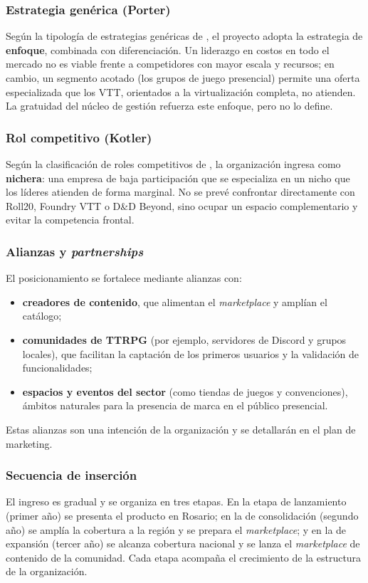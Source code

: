 \subsubsection{Estrategia genérica (Porter)}
Según la tipología de estrategias genéricas de \textcite{porter1985}, el proyecto adopta la estrategia de \textbf{enfoque}, combinada con diferenciación. Un liderazgo en costos en todo el mercado no es viable frente a competidores con mayor escala y recursos; en cambio, un segmento acotado (los grupos de juego presencial) permite una oferta especializada que los VTT, orientados a la virtualización completa, no atienden. La gratuidad del núcleo de gestión refuerza este enfoque, pero no lo define.

\subsubsection{Rol competitivo (Kotler)}
Según la clasificación de roles competitivos de \textcite{kotler2016}, la organización ingresa como \textbf{nichera}: una empresa de baja participación que se especializa en un nicho que los líderes atienden de forma marginal. No se prevé confrontar directamente con Roll20, Foundry VTT o D\&D Beyond, sino ocupar un espacio complementario y evitar la competencia frontal.

\subsubsection{Alianzas y \textit{partnerships}}
El posicionamiento se fortalece mediante alianzas con:
\begin{itemize}
  \item \textbf{creadores de contenido}, que alimentan el \textit{marketplace} y amplían el catálogo;
  \item \textbf{comunidades de TTRPG} (por ejemplo, servidores de Discord y grupos locales), que facilitan la captación de los primeros usuarios y la validación de funcionalidades;
  \item \textbf{espacios y eventos del sector} (como tiendas de juegos y convenciones), ámbitos naturales para la presencia de marca en el público presencial.
\end{itemize}
Estas alianzas son una intención de la organización y se detallarán en el plan de marketing.

\subsubsection{Secuencia de inserción}
El ingreso es gradual y se organiza en tres etapas. En la etapa de lanzamiento (primer año) se presenta el producto en Rosario; en la de consolidación (segundo año) se amplía la cobertura a la región y se prepara el \textit{marketplace}; y en la de expansión (tercer año) se alcanza cobertura nacional y se lanza el \textit{marketplace} de contenido de la comunidad. Cada etapa acompaña el crecimiento de la estructura de la organización.
